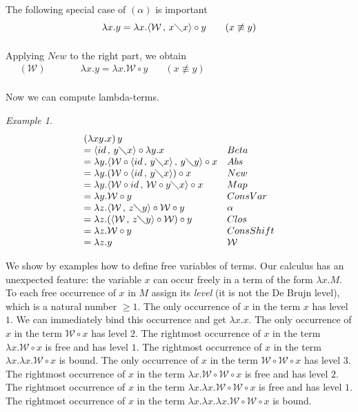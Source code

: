\documentclass[11pt]{amsart}
\theoremstyle{plain}
\theoremstyle{definition}
\theoremstyle{remark}
\newtheorem{example}[theorem]{Example}
\numberwithin{equation}{section}
\newcommand{\ci}{\circ}
\newcommand{\mi}{\,,\,}
\newcommand{\is}{\diagdown}
\newcommand{\la}{\langle}
\newcommand{\ra}{\rangle}
\renewcommand{\pi}{\mathcal{W}}
\begin{document}
The following special case of $(\alpha)$ is important
$$
\begin{array}{ll}
\lambda x.y=\lambda x.\la\pi\mi x\is x\ra\ci y & \quad(x\not\equiv y)\\
[5pt]
\end{array}$$

Applying $New$ to the right part, we obtain\\ $
\begin{array}{lccc}
\quad(\pi)& \qquad & \lambda x.y=\lambda x.\pi\ci y & \quad(x\not\equiv y)\\
[5pt]
\end{array}$

Now we can compute lambda-terms.
\begin{example}\label{primer}
$$\begin{array}{ll}
(\lambda x y.x)\,y & \\
= \langle id\mi y\is x\rangle\ci \lambda y.x &
Beta\\
=\lambda y.\langle\pi\ci \langle id\mi y\is x\rangle\mi y\is
y\rangle\ci x & Abs\\
=\lambda y.(\pi\ci \langle id\mi y\is x\rangle)\ci x &
New\\
=\lambda
y.\langle\pi\ci id\mi \pi\ci y\is x\rangle\ci x & Map\\
= \lambda y.\pi\ci y & ConsVar\\
=\lambda z.\langle\pi\mi z\is y\rangle\ci \pi\ci y &
\alpha\\
=\lambda z.(\langle\pi\mi z\is y\rangle\ci \pi)\ci y & Clos\\
=\lambda z.\pi\ci y & ConsShift\\
=\lambda z.y & \pi
\end{array}
$$
\end{example}

We show by examples how to define free variables of terms. Our
calculus has an unexpected feature: the variable $x$ can occur
freely in a term of the form $\lambda x.M$. To each free
occurrence of $x$ in $M$ assign its \emph{level} (it is not the De
Brujn level), which is a natural number $\geqslant 1$. The only
occurrence of $x$ in the term $x$ has  level $1$. We can
immediately bind this occurrence and get $\lambda x.x$. The only
occurrence of $x$ in the term $\pi\ci x$ has  level $2$. The
rightmost occurrence of $x$ in the term $\lambda x.\pi\ci x$ is
free and has  level $1$. The rightmost occurrence of $x$ in the
term $\lambda x.\lambda x.\pi\ci x$ is bound. The only occurrence
of $x$ in the term $\pi\circ\pi\ci x$ has  level $3$. The
rightmost occurrence of $x$ in the term $\lambda x.\pi\circ\pi\ci
x$ is free and has level $2$. The rightmost occurrence of $x$ in
the term $\lambda x.\lambda x.\pi\circ\pi\ci x$ is free and has
level $1$. The rightmost occurrence of $x$ in the term $\lambda
x.\lambda x.\lambda x.\pi\circ\pi\ci x$ is bound.
\end{document}
